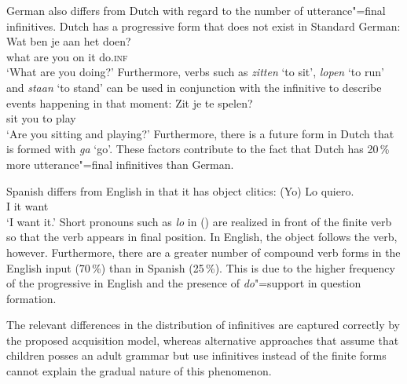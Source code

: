 German also differs from Dutch with regard to the number of utterance"=final infinitives. Dutch has a progressive form
that does not exist in Standard German:
\ea
\gll Wat ben je aan het doen?\\
     what are you on it do.\textsc{inf}\\
\glt `What are you doing?'
\z
Furthermore, verbs such as \emph{zitten} `to sit', \emph{lopen} `to run' and \emph{staan}
`to stand' can be used in conjunction with the infinitive to describe events happening in that moment:
\ea
\gll Zit je te spelen?\\
     sit you to play\\
\glt `Are you sitting and playing?' 
\z
Furthermore, there is a future form in Dutch that is formed with \emph{ga} `go'. These factors
contribute to the fact that Dutch has 20\,\% more utterance"=final infinitives than German.

Spanish differs from English in that it has object clitics:
\ea
\gll (Yo) Lo quiero.\\
     I it want\\
\glt `I want it.'
\z
Short pronouns such as \emph{lo} in () are realized in front of the finite verb so that the verb
appears in final position. In English, the object follows the verb, however. Furthermore, there are
a greater number of compound verb forms in the English input (70\,\%) than in Spanish (25\,\%).
This is due to the higher frequency of the progressive in English and the
presence of \emph{do}"=support in question formation.

The relevant differences in the distribution of infinitives are captured correctly by the proposed acquisition model,
whereas alternative approaches that assume that children posses an adult grammar but use infinitives
instead of the finite forms cannot explain the gradual nature of this phenomenon.

